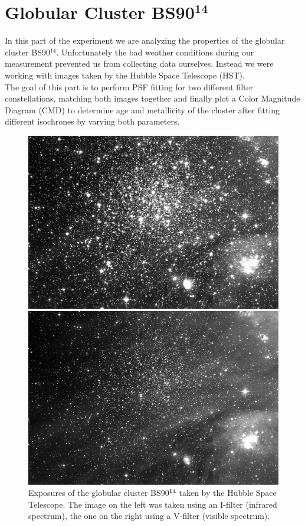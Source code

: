 \chapter{Globular Cluster BS90$^{\mathbf{14}}$}
In this part of the experiment we are analyzing the properties of the globular cluster BS90$^{14}$. Unfortunately the bad weather conditions during our measurement prevented us from collecting data  ourselves. Instead we were working with images taken by the Hubble Space Telescope (HST).\\
The goal of this part is to perform PSF fitting for two different filter constellations, matching both images together and finally plot a Color Magnitude Diagram (CMD) to determine age and metallicity of the cluster after fitting different isochrones by varying both parameters.
\begin{figure}[H]
\begin{minipage}{0.49\textwidth}
	\includegraphics[scale = 0.085]{figures/Exposures/BS90_I}
\end{minipage}
\hfill
\begin{minipage}{0.49\textwidth}
\includegraphics[scale = 0.085]{figures/Exposures/BS90_V}
\end{minipage}
\caption[Exposures of the globular cluster BS90$^{\mathbf{14}}$]{Exposures of the globular cluster BS90$^{\mathbf{14}}$ taken by the Hubble Space Telescope. The image on the left was taken using an I-filter (infrared spectrum), the one on the right using a V-filter (visible spectrum).}
\end{figure}

